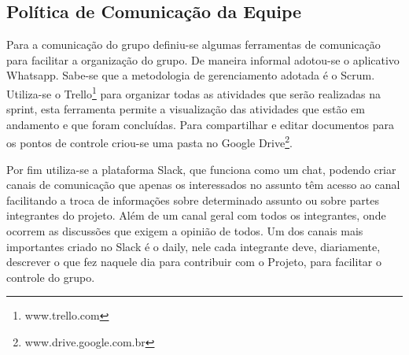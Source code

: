 \subsection{Política de Comunicação da Equipe} %
\label{sub:política_de_comunicação_da_equipe}
	
	Para a comunicação do grupo definiu-se algumas ferramentas de comunicação para facilitar a organização do grupo. De maneira informal adotou-se o aplicativo Whatsapp. Sabe-se que a metodologia de gerenciamento adotada é o Scrum. Utiliza-se o Trello\footnote{www.trello.com} para organizar todas as atividades que serão realizadas na sprint, esta ferramenta permite a visualização das atividades que estão em andamento e que foram concluídas. Para compartilhar e editar documentos para os pontos de controle criou-se uma pasta no Google Drive\footnote{www.drive.google.com.br}.
	
	Por fim utiliza-se a plataforma Slack, que funciona como um chat, podendo criar canais de comunicação que apenas os interessados no assunto têm acesso ao canal facilitando a troca de informações sobre determinado assunto ou sobre partes integrantes do projeto. Além de um canal geral com todos os integrantes, onde ocorrem as discussões que exigem a opinião de todos. Um dos canais mais importantes criado no Slack é o daily, nele cada integrante deve, diariamente, descrever o que fez naquele dia para contribuir com o Projeto, para facilitar o controle do grupo.

